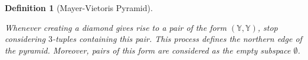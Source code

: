 \documentclass[11pt]{article}
\newtheorem{definition}[theorem]{Definition}
\theoremstyle{remark}
\newcommand{\Y}{\mathbb{Y}}
\begin{document}
\begin{definition}[Mayer-Vietoris Pyramid]
\begin{enumerate}
\end{enumerate}


\noindent Whenever creating a diamond gives rise to a pair of the form $(\Y,\Y)$, stop considering $3$-tuples containing this pair. This process defines the northern edge of the pyramid. Moreover, pairs of this form are considered as the empty subspace $\emptyset$. 



\end{definition}
\end{document}
